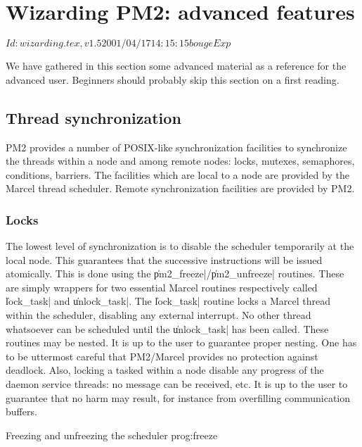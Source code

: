 \chapter{Wizarding PM2: advanced features}

\stamp $Id: wizarding.tex,v 1.5 2001/04/17 14:15:15 bouge Exp $

We have gathered in this section some advanced material as a reference
for the advanced user. Beginners should probably skip this section on
a first reading. 

\section{Thread synchronization}

PM2 provides a number of POSIX-like synchronization facilities to
synchronize the threads within a node and among remote nodes: locks,
mutexes, semaphores, conditions, barriers. The facilities which are
local to a node are provided by the Marcel thread scheduler. Remote
synchronization facilities are provided by PM2.

\subsection{Locks}

The lowest level of synchronization is to disable the scheduler
temporarily at the local node. This guarantees that the successive
instructions will be issued atomically. This is done using the
\|pm2_freeze|/\|pm2_unfreeze| routines. These are simply wrappers for
two essential Marcel routines respectively called \|lock_task| and
\|unlock_task|. The \|lock_task| routine locks a Marcel thread within
the scheduler, disabling any external interrupt. No other thread
whatsoever can be scheduled until the \|unlock_task| has been called.
These routines may be nested. It is up to the user to guarantee proper
nesting. One has to be uttermost careful that PM2/Marcel provides no
protection against deadlock. Also, locking a tasked within a node
disable any progress of the daemon service threads: no message can be
received, etc. It is up to the user to guarantee that no harm may
result, for instance from overfilling communication buffers.

 {Freezing and unfreezing the scheduler}
{prog:freeze}

